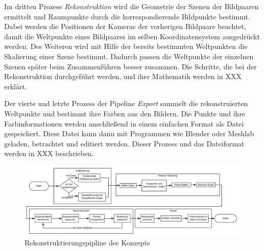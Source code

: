 Im dritten Prozess \emph{Rekonstruktion} wird die Geometrie der Szenen der Bildpaaren ermittelt und Raumpunkte durch die korrespondierende Bildpunkte bestimmt.
Dabei werden die Positionen der Kameras der vorherigen Bildpaare beachtet, damit die Weltpunkte eines Bildpaares im selben Koordinatensystem ausgedrückt werden.
Des Weiteren wird mit Hilfe der bereits bestimmten Weltpunkten die Skalierung einer Szene bestimmt.
Dadurch passen die Weltpunkte der einzelnen Szenen später beim Zusammenführen besser zusammen.
Die Schritte, die bei der Rekonstruktion durchgeführt werden, und ihre Mathematik werden in XXX erklärt.

Der vierte und letzte Prozess der Pipeline \emph{Export} sammelt die rekonstruierten Weltpunkte und bestimmt ihre Farben aus den Bildern.
Die Punkte und ihre Farbinformationen werden anschließend in einem einfachen Format als Datei gespeichert.
Diese Datei kann dann mit Programmen wie Blender oder Meshlab geladen, betrachtet und editiert werden.
Dieser Prozess und das Dateiformat werden in XXX beschrieben.


\begin{figure}
    \centering
    \includegraphics{src/img/konzept-pipeline.png}
    \caption{Rekonstruktierungspipline des Konzepts}
    \label{fig:concept-pipeline}
\end{figure}
